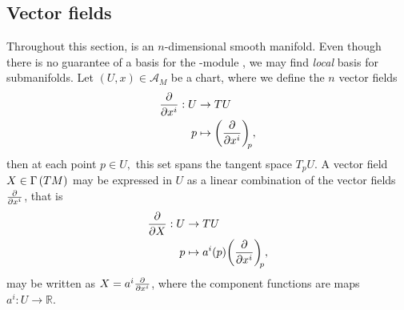\subsection{Vector fields}
Throughout this section,  is an \(n\)-dimensional smooth manifold. Even though there is no guarantee of a basis for the -module , we may find \emph{local} basis for submanifolds. Let \((U, x) \in \mathscr{A}_M\) be a chart, where we define the \(n\) vector fields
\begin{align*}
    \bfield{x^i} : U &\to TU\\
                   p &\mapsto \bvec{x^i}{p},
\end{align*}
then at each point \(p \in U,\) this set spans the tangent space \(T_pU\). A vector field \(X \in\Gamma\left(TM\right)\) may be expressed in \(U\) as a linear combination of the vector fields \(\bfield{x^i}\), that is
\begin{align*}
    \bfield{X} : U &\to TU\\
                   p &\mapsto a^i(p) \bvec{x^i}{p},
\end{align*}
may be written as \(X = a^i \bfield{x^i}\), where the component functions are maps \(a^i : U \to \mathbb{R}\).

